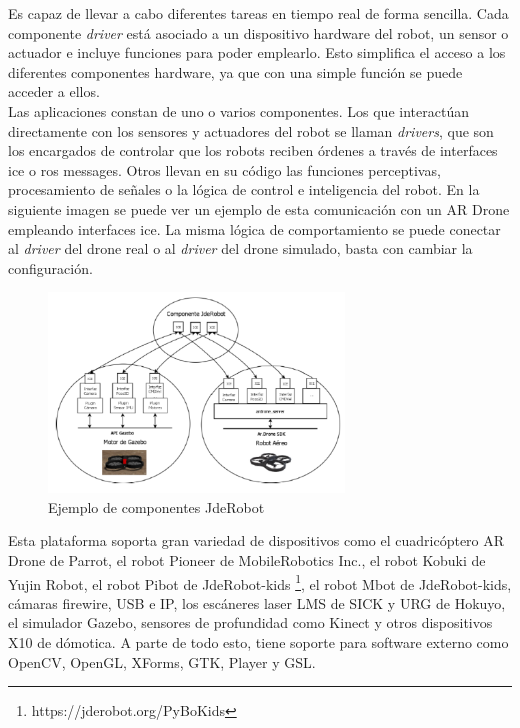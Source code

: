 Es capaz de llevar a cabo diferentes tareas en tiempo real de forma sencilla. Cada componente \textit{driver} está asociado a un dispositivo hardware del robot, un sensor o actuador e incluye funciones para poder emplearlo. Esto simplifica el acceso a los diferentes componentes hardware, ya que con una simple función se puede acceder a ellos.\\

Las aplicaciones constan de uno o varios componentes. Los que interactúan directamente con los sensores y actuadores del robot se llaman \textit{drivers}, que son los encargados de controlar que los robots reciben órdenes a través de interfaces \acrshort{ice} o \acrshort{ros} messages. Otros llevan en su código las funciones perceptivas, procesamiento de señales o la lógica de control e inteligencia del robot. En la siguiente imagen se puede ver un ejemplo de esta comunicación con un AR Drone empleando interfaces \acrshort{ice}. La misma lógica de comportamiento se puede conectar al \textit{driver} del drone real o al \textit{driver} del drone simulado, basta con cambiar la configuración.\\

\begin{figure}[H]
  \begin{center}
    \includegraphics[width=0.7\textwidth]{figures/Estado_arte/jderobot.png}
		\caption{Ejemplo de componentes JdeRobot }
		\label{fig.jderobot}
		\end{center}
\end{figure}

Esta plataforma soporta gran variedad de dispositivos como el cuadricóptero AR Drone de Parrot, el robot Pioneer de MobileRobotics Inc., el robot Kobuki de Yujin Robot, el robot Pibot de  JdeRobot-kids \footnote{https://jderobot.org/PyBoKids}, el robot Mbot de  JdeRobot-kids, cámaras firewire, USB e IP, los escáneres laser LMS de SICK y URG de Hokuyo, el simulador Gazebo, sensores de profundidad como Kinect y otros dispositivos X10 de dómotica. A parte de todo esto, tiene soporte para software externo como OpenCV, OpenGL, XForms, GTK, Player y GSL. \\

